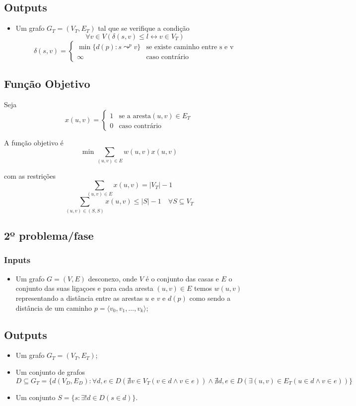 \documentclass[a4paper,12pt,titlepage]{article}
\let\biconditional\leftrightarrow
\begin{document}
\subsection*{Outputs}
\begin{itemize}
\item Um grafo $G_T = ( V_T,E_T )$ tal que se verifique a condição
$$ \forall v \in V(\delta(s,v) \leq l \biconditional v \in V_T)$$
$$\delta(s,v) = 
\begin{cases}
\min \{d(p): s \leadsto^p v\} & \text{se existe caminho entre s e v}\\
\infty & \text{caso contrário} 
\end{cases}$$
\end{itemize}

\subsection*{Função Objetivo}
Seja $$x(u,v) = \begin{cases}
1 & \text{se a aresta} (u,v) \in E_T\\
0 & \text{caso contrário} 
\end{cases}$$

A função objetivo é
$$\min \sum_{(u,v)\in E} w(u,v)x(u,v)$$

com as restrições 
$$\sum_{(u,v)\in E} x(u,v) = |V_T| - 1$$
$$\sum_{(u,v)\in (S,S)} x(u,v) \leq |S| - 1 \quad \forall S \subseteq  V_T$$

\subsection*{2º problema/fase}
\subsubsection*{Inputs}
\begin{itemize}
\item Um grafo  $G= ( V, E ) $ desconexo, onde $V$ é o conjunto das casas e $E$ o conjunto das suas ligaçoes e para cada aresta $(u,v)\in E$ temos $w(u,v)$ representando a distância entre as arestas $u$ e $v$ e $d(p)$ como sendo a distância de um caminho $p = \langle v_0,v_1,\ldots , v_k\rangle$;
\end{itemize}

\subsection*{Outputs}
\begin{itemize}
\item Um grafo $G_T = ( V_T,E_T )$;
\item Um conjunto de grafos $D \subseteq G_T = \{d(V_D,E_D): \forall d,e \in D(\nexists v \in V_T(v \in d \land v \in e)) \land \nexists d,e\in D(\exists(u,v) \in E_T(u \in d \land v \in e)) \}$
\item Um conjunto $S = \{s : \exists! d \in D(s \in d)\}$.
\end{itemize}
\end{document}

